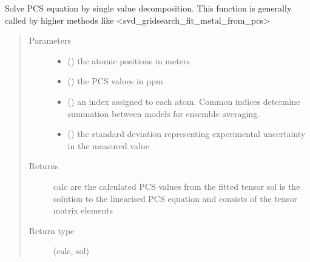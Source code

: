 \documentclass[a4paper,10pt,english]{sphinxmanual}
\begin{document}
\begin{fulllineitems}
\label{\detokenize{reference/generated/paramagpy.fit.svd_calc_metal_from_pcs:paramagpy.fit.svd_calc_metal_from_pcs}}
Solve PCS equation by single value decomposition.
This function is generally called by higher methods like
\textless{}svd\_gridsearch\_fit\_metal\_from\_pcs\textgreater{}
\begin{quote}\begin{description}
\item[{Parameters}] \leavevmode\begin{itemize}
\item {} 
 (\sphinxstyleliteralemphasis{\sphinxupquote{ {[}}}\sphinxstyleliteralemphasis{\sphinxupquote{,}}\sphinxstyleliteralemphasis{\sphinxupquote{,}}\sphinxstyleliteralemphasis{\sphinxupquote{{]} }}) \textendash{} the atomic positions in meters

\item {} 
 () \textendash{} the PCS values in ppm

\item {} 
 () \textendash{} an index assigned to each atom. Common indices determine summation
between models for ensemble averaging.

\item {} 
 () \textendash{} the standard deviation representing experimental uncertainty
in the measured value

\end{itemize}

\item[{Returns}] \leavevmode
{} \textendash{} calc are the calculated PCS values from the fitted tensor
sol is the solution to the linearised PCS equation and
consists of the tensor matrix elements

\item[{Return type}] \leavevmode
(calc, sol)

\end{description}\end{quote}

\end{fulllineitems}
\end{document}
